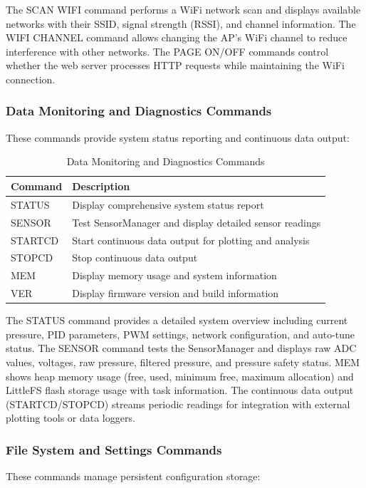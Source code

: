 The SCAN WIFI command performs a WiFi network scan and displays available networks with their SSID, signal strength (RSSI), and channel information. The WIFI CHANNEL command allows changing the AP's WiFi channel to reduce interference with other networks. The PAGE ON/OFF commands control whether the web server processes HTTP requests while maintaining the WiFi connection.

\subsubsection{Data Monitoring and Diagnostics Commands}
These commands provide system status reporting and continuous data output:

\begin{table}[H]
\centering
\begin{tabular}{@{}ll@{}}
\toprule
\textbf{Command} & \textbf{Description} \\
\midrule
STATUS & Display comprehensive system status report \\
SENSOR & Test SensorManager and display detailed sensor readings \\
STARTCD & Start continuous data output for plotting and analysis \\
STOPCD & Stop continuous data output \\
MEM & Display memory usage and system information \\
VER & Display firmware version and build information \\
\bottomrule
\end{tabular}
\caption{Data Monitoring and Diagnostics Commands}
\end{table}

The STATUS command provides a detailed system overview including current pressure, PID parameters, PWM settings, network configuration, and auto-tune status. The SENSOR command tests the SensorManager and displays raw ADC values, voltages, raw pressure, filtered pressure, and pressure safety status. MEM shows heap memory usage (free, used, minimum free, maximum allocation) and LittleFS flash storage usage with task information. The continuous data output (STARTCD/STOPCD) streams periodic readings for integration with external plotting tools or data loggers.

\subsubsection{File System and Settings Commands}
These commands manage persistent configuration storage:


